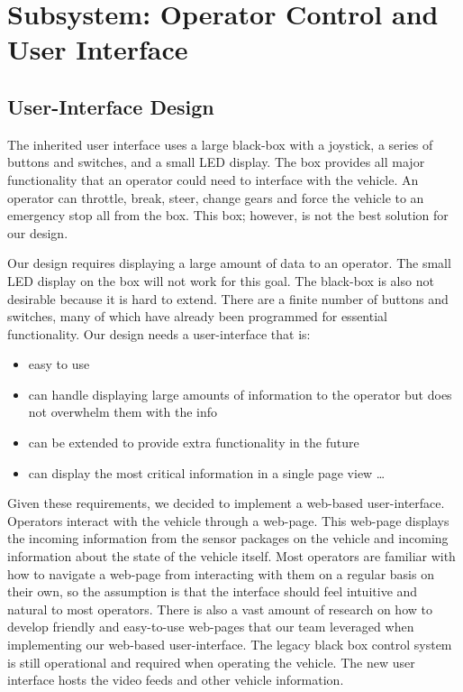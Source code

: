 \chapter{Subsystem: Operator Control and User Interface} \label{ch:ui}

\section{User-Interface Design}The inherited user interface uses a large black-box with a joystick, a series of buttons and switches, and a small LED display.  The box provides all major functionality that an operator could need to interface with the vehicle.  An operator can throttle, break, steer, change gears and force the vehicle to an emergency stop all from the box.  This box; however, is not the best solution for our design.

Our design requires displaying a large amount of data to an operator.  The small LED display on the box will not work for this goal.  The black-box is also not desirable because it is hard to extend.  There are a finite number of buttons and switches, many of which have already been programmed for essential functionality.  Our design needs a user-interface that is:
\begin{itemize}
	\item easy to use
    \item can handle displaying large amounts of information to the operator but does not overwhelm them with the info
    \item can be extended to provide extra functionality in the future 
    \item can display the most critical information in a single page view
    \ldots
\end{itemize}
  
Given these requirements, we decided to implement a web-based user-interface.  Operators interact with the vehicle through a web-page.  This web-page displays the incoming information from the sensor packages on the vehicle and incoming information about the state of the vehicle itself.  Most operators are familiar with how to navigate a web-page from interacting with them on a regular basis on their own, so the assumption is that the interface should feel intuitive and natural to most operators.  There is also a vast amount of research on how to develop friendly and easy-to-use web-pages that our team leveraged when implementing our web-based user-interface. The legacy black box control system is still operational and required when operating the vehicle. The new user interface hosts the video feeds and other vehicle information.


